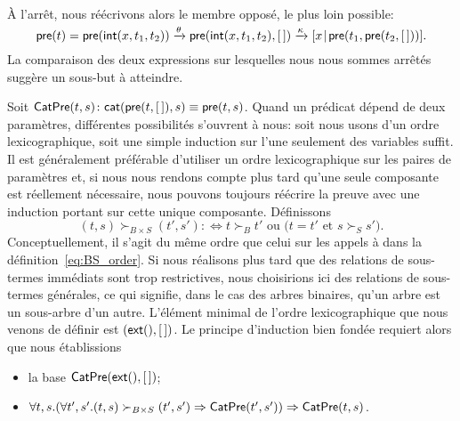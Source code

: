 À l'arrêt, nous réécrivons alors le membre opposé, le plus loin
possible:
\begin{equation*}
  \fun{pre}(t) = \fun{pre}(\fun{int}(x,t_1,t_2))
\xrightarrow{\smash{\theta}} \fun{pre}(\fun{int}(x,t_1,t_2),\el)
\xrightarrow{\smash{\kappa}}
\cons{x}{\fun{pre}(t_1,\fun{pre}(t_2,\el))}.
\index{pre@\fun{pre/1}}
\index{pre@\fun{pre/2}}
\end{equation*}
La comparaison des deux expressions sur lesquelles nous nous sommes
arrêtés suggère un sous-but à atteindre.

Soit \(\textsf{CatPre}({t,s}) \colon \textsf{cat}(\textsf{pre}(t,[\,]),s) \equiv
\textsf{pre}(t,s)\). Quand
un prédicat dépend de deux paramètres, différentes possibilités
s'ouvrent à nous: soit nous usons d'un ordre lexicographique, soit une
simple induction sur l'une seulement des variables suffit. Il est
généralement préférable d'utiliser un ordre
lexicographique sur les paires
de paramètres et, si nous nous rendons compte plus tard qu'une seule
composante est réellement nécessaire, nous pouvons toujours réécrire
la preuve avec une induction portant sur cette unique
composante. Définissons
\begin{equation*}
(t,s) \succ_{B \times S} (t',s') :\Leftrightarrow \text{\(t \succ_{B}
    t'\) ou (\(t = t'\) et \(s \succ_{S} s'\))}.
\end{equation*}
Conceptuellement, il s'agit du même ordre que celui sur les appels à
 dans la
définition~\eqref{eq:BS_order}. Si nous réalisons plus tard que des
relations de sous-termes immédiats sont trop restrictives, nous
choisirions ici des relations de sous-termes générales, ce qui
signifie, dans le cas des arbres binaires, qu'un arbre est un
sous-arbre d'un autre. L'élément minimal de l'ordre lexicographique
que nous venons de définir est \((\textsf{ext}(),[\,])\). Le principe
d'induction bien fondée requiert alors que nous établissions
\begin{itemize}

  \item la base \(\textsf{CatPre}({\textsf{ext}(),[\,]})\);

  \item \(\forall t,s. (\forall t',s'.(t,s) \succ_{B \times S} (t',s')
    \Rightarrow \textsf{CatPre}({t',s'})) \Rightarrow
    \textsf{CatPre}({t,s})\).

\end{itemize}

